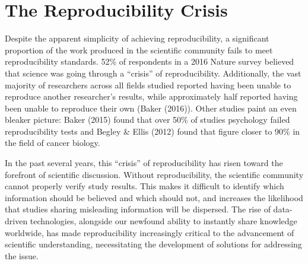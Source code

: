 \documentclass[12pt,twoside]{reedthesis}
\begin{document}
\hypertarget{the-reproducibility-crisis}{%
\section{The Reproducibility Crisis}\label{the-reproducibility-crisis}}

Despite the apparent simplicity of achieving reproducibility, a significant proportion of the work produced in the scientific community fails to meet reproducibility standards. 52\% of respondents in a 2016 Nature survey believed that science was going through a ``crisis'' of reproducibility. Additionally, the vast majority of researchers across all fields studied reported having been unable to reproduce another researcher's results, while approximately half reported having been unable to reproduce their own (Baker (2016)). Other studies paint an even bleaker picture: Baker (2015) found that over 50\% of studies psychology failed reproducibility tests and Begley \& Ellis (2012) found that figure closer to 90\% in the field of cancer biology.

In the past several years, this ``crisis'' of reproducibility has risen toward the forefront of scientific discussion. Without reproducibility, the scientific community cannot properly verify study results. This makes it difficult to identify which information should be believed and which should not, and increases the likelihood that studies sharing misleading information will be dispersed. The rise of data-driven technologies, alongside our newfound ability to instantly share knowledge worldwide, has made reproducibility increasingly critical to the advancement of scientific understanding, necessitating the development of solutions for addressing the issue.
\end{document}
